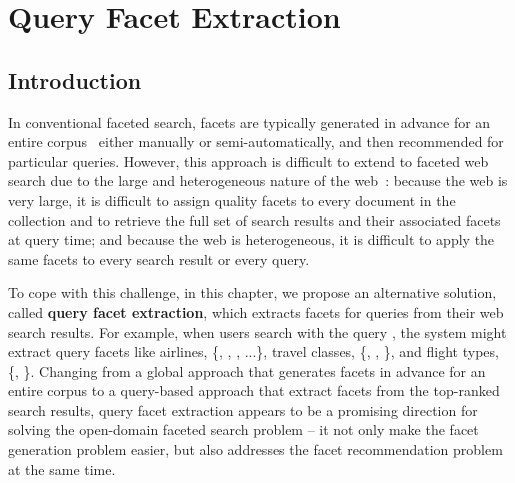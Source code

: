 \chapter{Query Facet Extraction}
\label{ch:facet}
\section{Introduction}
In conventional faceted search, facets are typically generated in advance for an entire corpus~\cite{stoica2007automating,dakka2008automatic} either manually or semi-automatically, and then recommended for particular queries. However, this approach is difficult to extend to faceted web search due to the large and heterogeneous nature of the web~\cite{teevan2008challenges}: because the web is very large, it is
difficult to assign quality facets to every document in the collection and to retrieve the full set of search results and their associated facets at query time; and because the web is heterogeneous, it is difficult to apply the same facets to every search result or every query.

To cope with this challenge, in this chapter, we propose an alternative solution, called \textbf{query facet extraction}, which extracts facets for queries from their web search results. For example, when users search with the query , the system might extract query facets like airlines, \{, , , ...\}, travel classes, \{, , \}, and flight types, \{, \}. Changing from a global approach that generates facets in advance for an entire corpus to a query-based approach that extract facets from the top-ranked search results, query facet extraction appears to be a promising direction for solving the open-domain faceted search problem -- it not only make the facet generation problem easier, but also addresses the facet recommendation problem at the same time.



